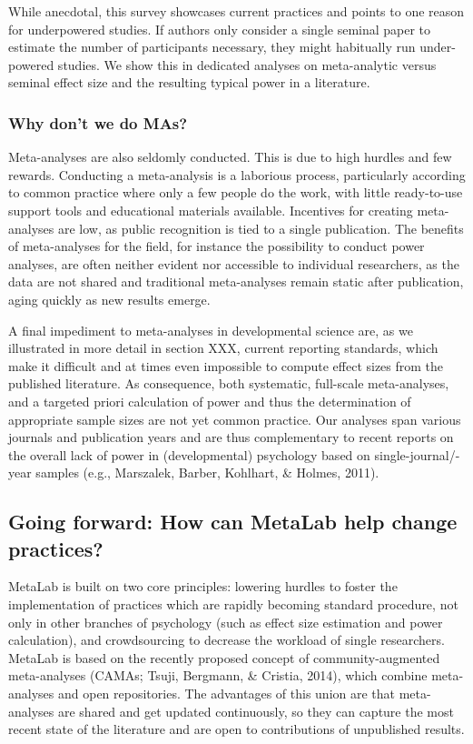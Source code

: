 \documentclass[english,floatsintext,man]{apa6}
\newcounter{author}
\begin{document}
While anecdotal, this survey showcases current practices and points to
one reason for underpowered studies. If authors only consider a single
seminal paper to estimate the number of participants necessary, they
might habitually run under-powered studies. We show this in dedicated
analyses on meta-analytic versus seminal effect size and the resulting
typical power in a literature.

\subsubsection{Why don't we do MAs?}\label{why-dont-we-do-mas}

Meta-analyses are also seldomly conducted. This is due to high hurdles
and few rewards. Conducting a meta-analysis is a laborious process,
particularly according to common practice where only a few people do the
work, with little ready-to-use support tools and educational materials
available. Incentives for creating meta-analyses are low, as public
recognition is tied to a single publication. The benefits of
meta-analyses for the field, for instance the possibility to conduct
power analyses, are often neither evident nor accessible to individual
researchers, as the data are not shared and traditional meta-analyses
remain static after publication, aging quickly as new results emerge.

A final impediment to meta-analyses in developmental science are, as we
illustrated in more detail in section XXX, current reporting standards,
which make it difficult and at times even impossible to compute effect
sizes from the published literature. As consequence, both systematic,
full-scale meta-analyses, and a targeted priori calculation of power and
thus the determination of appropriate sample sizes are not yet common
practice. Our analyses span various journals and publication years and
are thus complementary to recent reports on the overall lack of power in
(developmental) psychology based on single-journal/-year samples (e.g.,
Marszalek, Barber, Kohlhart, \& Holmes, 2011).

\subsection{Going forward: How can MetaLab help change
practices?}\label{going-forward-how-can-metalab-help-change-practices}

MetaLab is built on two core principles: lowering hurdles to foster the
implementation of practices which are rapidly becoming standard
procedure, not only in other branches of psychology (such as effect size
estimation and power calculation), and crowdsourcing to decrease the
workload of single researchers. MetaLab is based on the recently
proposed concept of community-augmented meta-analyses (CAMAs; Tsuji,
Bergmann, \& Cristia, 2014), which combine meta-analyses and open
repositories. The advantages of this union are that meta-analyses are
shared and get updated continuously, so they can capture the most recent
state of the literature and are open to contributions of unpublished
results.
\end{document}
